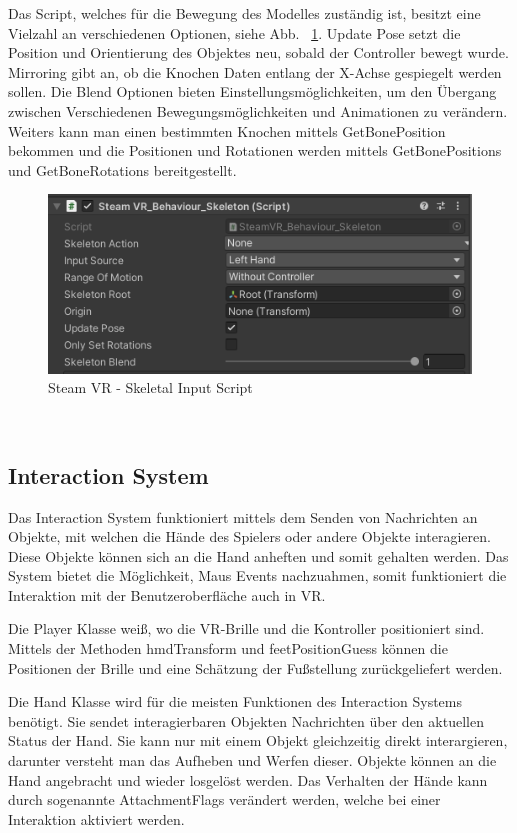 Das Script, welches für die Bewegung des Modelles zuständig ist, besitzt eine Vielzahl an verschiedenen Optionen, siehe Abb. ~\ref{fig:steamvr_skeletal_input_Script}.
Update Pose setzt die Position und Orientierung des Objektes neu, sobald der Controller bewegt wurde.
Mirroring gibt an, ob die Knochen Daten entlang der X-Achse gespiegelt werden sollen.
Die Blend Optionen bieten Einstellungsmöglichkeiten, um den Übergang zwischen Verschiedenen Bewegungsmöglichkeiten und Animationen zu verändern.
Weiters kann man einen bestimmten Knochen mittels GetBonePosition bekommen und die Positionen und Rotationen werden mittels GetBonePositions und GetBoneRotations bereitgestellt.
\begin {figure}
    \centering
    \includegraphics[scale=1]{pics/steamVR_skeletal_input_script}
    \caption{Steam VR - Skeletal Input Script}
    \label{fig:steamvr_skeletal_input_Script}
\end {figure}
~\cite{SteamVR_Skeleton_Input_2022}

\subsection{Interaction System}\label{subsec:interaction-system}
Das Interaction System funktioniert mittels dem Senden von Nachrichten an Objekte, mit welchen die Hände des Spielers oder andere Objekte interagieren.
Diese Objekte können sich an die Hand anheften und somit gehalten werden.
Das System bietet die Möglichkeit, Maus Events nachzuahmen, somit funktioniert die Interaktion mit der Benutzeroberfläche auch in VR.

Die Player Klasse weiß, wo die VR-Brille und die Kontroller positioniert sind.
Mittels der Methoden hmdTransform und feetPositionGuess können die Positionen der Brille und eine Schätzung der Fußstellung zurückgeliefert werden.

Die Hand Klasse wird für die meisten Funktionen des Interaction Systems benötigt.
Sie sendet interagierbaren Objekten Nachrichten über den aktuellen Status der Hand.
Sie kann nur mit einem Objekt gleichzeitig direkt interargieren, darunter versteht man das Aufheben und Werfen dieser.
Objekte können an die Hand angebracht und wieder losgelöst werden.
Das Verhalten der Hände kann durch sogenannte AttachmentFlags verändert werden, welche bei einer Interaktion aktiviert werden.

